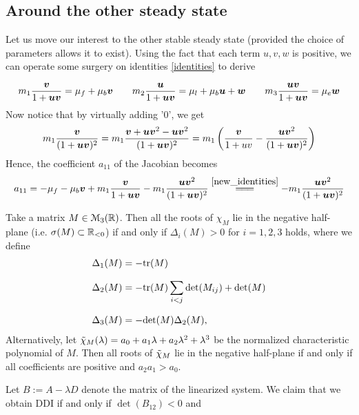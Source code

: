 \subsection{Around the other steady state}

Let us move our interest to the other stable steady state (provided the choice of parameters allows it to exist). Using the fact that each term $u, v, w$ is positive, we can operate some surgery on identities \ref{identities} to derive

\begin{equation}
	\label{new_identities}
		m_1 \dfrac{\bm{v}}{1 + \bm{u} \bm{v}} = \mu_f +  \mu_b \bm{v} \quad \quad
		m_2 \dfrac{\bm{u}}{1 +   \bm{u} \bm{v}}  = \mu_l +  \mu_b \bm{u} + \bm{w} \quad \quad
		m_3 \dfrac{ \bm{u} \bm{v}}{1 +  \bm{u} \bm{v}} = \mu_e \bm{w}
\end{equation}
Now notice that by virtually adding '0', we get
$$m_1 \frac{\bm{v}}{(1+\bm{u}\bm{v})^2} = m_1 \frac{\bm{v}+ \bm{u}\bm{v}^2 - \bm{u} \bm{v}^2}{(1 + \bm{u}\bm{v})^2} = m_1 \left(\frac{\bm{v}}{1+uv} - \frac{\bm{u}\bm{v}^2}{(1 + \bm{u}\bm{v})^2}\right)$$
Hence, the coefficient $a_{11}$ of the Jacobian becomes
$$a_{11} = -\mu_f - \mu_b \bm{v} + m_1 \frac{\bm{v}}{1+\bm{u}\bm{v}} - m_1 \frac{\bm{u}\bm{v}^2}{(1 + \bm{u}\bm{v})^2} \overset{\ref{new_identities}}{=\!=\!=} -m_1 \frac{\bm{u}\bm{v}^2}{(1 + \bm{u}\bm{v})^2}$$



\begin{theorem}
	Take a matrix $M \in \EuScript{M}_3(\mathbb{R})$. Then all the roots of $\chi_M$ lie in the negative half-plane (i.e. $\sigma(M) \subset \mathbb{R}_{<0}$) if and only if
	$\Delta_i(M) > 0$ for $i=1, 2, 3$ holds, where we define
	\begin{align*}
		\Delta_1(M) &= -\mathrm{tr}(M) \\[0.7em]
		\Delta_2(M) &= -\mathrm{tr}(M) \sum_{i < j} \mathrm{det}(M_{ij}) + \mathrm{det}(M) \\[0.7em]
		\Delta_3(M) &= -\mathrm{det}(M) \Delta_2(M),
	\end{align*}
Alternatively, let $\Tilde{\chi}_{M}(\lambda) = a_0 + a_1 \lambda + a_2 \lambda^2 + \lambda^3$ be the normalized characteristic polynomial of $M$. Then all roots of $\Tilde{\chi}_M$ lie in the negative half-plane if and only if all coefficients are positive and $a_2 a_1 > a_0$.
\end{theorem}


\begin{lemma} Let $B := A - \lambda D$ denote the matrix of the linearized system. We claim that we obtain DDI if and only if $\det(B_{12}) < 0$ and 
	
\end{lemma}


